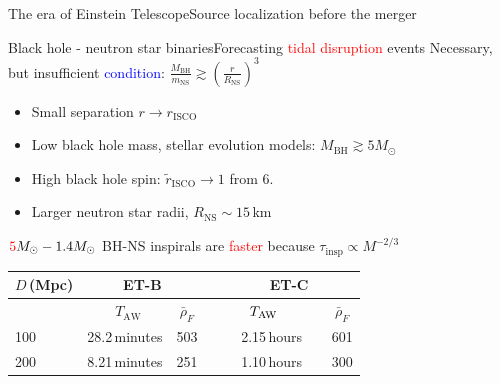 \documentclass[xcolor=dvipsnames,t]{beamer}
\newcommand{\red}[1]{\textcolor{red}{#1}}
\newcommand{\bl}[1]{\textcolor{blue}{#1}}
\newcommand{\f}{\frac}
\newcommand\T{\rule{0pt}{2.6ex}}       %
\newcommand\B{\rule[-1.2ex]{0pt}{0pt}} %
\begin{document}
\begin{frame}{The era of Einstein Telescope}{Source localization before the merger}
\end{frame}


\begin{frame}{Black hole - neutron star binaries}{Forecasting \red{tidal disruption} events}
  Necessary, but insufficient \bl{condition}:
  $   \f{M_\text{BH}}{m_\text{NS}} \gtrsim \left(\f{r}{R_\text{NS}}\right)^3  $
  \begin{itemize}
  \item Small separation $r\to r_\text{ISCO}$
  \item Low black hole mass, stellar evolution models: $M_\text{BH}\gtrsim 5M_\odot$
  \item High black hole spin: $\tilde{r}_\text{ISCO}\to 1$ from 6.
  \item Larger neutron star radii, $R_\text{NS}\sim15\,$km
  \end{itemize}
  $\red{5} M_\odot -1.4 M_\odot$ BH-NS inspirals are \red{faster} because $\tau_\text{insp} \propto M^{-2/3}$
  \begin{footnotesize}
  \begin{table}[h]
  \centering
  \begin{tabular}{lccccc}
  \hline\hline
  $D\,$(Mpc) & \multicolumn{2}{c}{ET-B} &  & \multicolumn{2}{c}{ET-C}\T\B\\
  \hline
  {}&  \ \hspace{6mm}$T_\text{AW}$ \hspace{8mm} & $\bar{\rho}_{F}$ &{}  & $\hspace{6mm}T_\text{AW} \hspace{10mm}$ & $\bar{\rho}_{F}$\T\B\\
  100 &   28.2\,minutes & 503 &{\qquad} &  2.15\,hours & 601\T\\
  200 & 8.21\,minutes & 251  &{\qquad} & 1.10\,hours & 300 \\

\end{tabular}
\end{table}
\end{footnotesize}
\end{frame}
\end{document}
